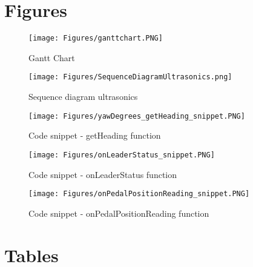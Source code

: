 \documentclass[12pt]{article}
\begin{document}
\begin{appendices} 
\section{Figures}\label{appendix: figures}
\begin{figure}[H]
\centering
\texttt{[image: Figures/ganttchart.PNG]}
\caption{Gantt Chart}
\label{fig:ganttchart}
\end{figure}

\begin{figure}[H]
\centering
\texttt{[image: Figures/SequenceDiagramUltrasonics.png]}
\caption{Sequence diagram ultrasonics}
\label{fig:sd_ultrasonics}
\end{figure}

\begin{figure}[H]
\centering
\texttt{[image: Figures/yawDegrees\_getHeading\_snippet.PNG]}
\caption{Code snippet - getHeading function}
\label{fig:getHeading_snippet}
\end{figure}

\begin{figure}[H]
\centering
\texttt{[image: Figures/onLeaderStatus\_snippet.PNG]}
\caption{Code snippet - onLeaderStatus function}
\label{fig:onLeaderStatus_snippet}
\end{figure}

\begin{figure}[H]
\centering
\texttt{[image: Figures/onPedalPositionReading\_snippet.PNG]}
\caption{Code snippet - onPedalPositionReading function}
\label{fig:onPedalPositionReading_snippet}
\end{figure}
\pagebreak

\section{Tables} \label{appendix: tables}


\end{appendices}
\end{document}
